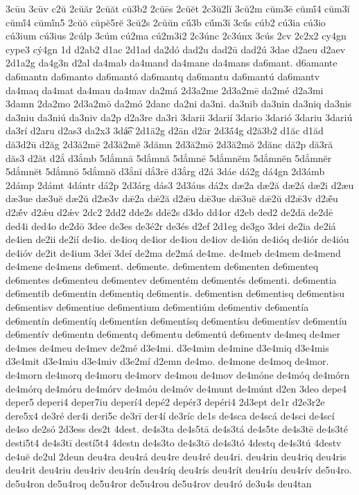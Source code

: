 {3cūu
3cūv
c2ŭ
2cŭăr
2cŭăt
cŭ3b2
2cŭēs
2cŭĕt
2c3ŭ2lĭ
3cŭ2m
cŭm3ē
cŭmī́4
cŭm3ĭ
cŭmĭ́4
cŭmĭ́n5
2cŭŏ
cŭpĕ5rĕ
3cŭ2s
2cŭŭn
cŭ́3b
cŭ́m3ĭ
3cŭ́s
cúb2
cú3ia
cú3io
cú3ium
cú3ius
2cúlp
3cúm
cú2ma
cú2m3i2
2c3únc
2c3únx
3cús
2cv
2c2x2
cy4gn
cype3
cý4gn
1d
d2ab2
d1ac
2d1ad
da2dó
dad2u
dad2ū
dad2ú
3dae
d2aeu
d2aev
2d1a2g
da4g3n
d2al
da4mab
da4mand
da4mane
da4mans
da6mant.
d6amante
da6mantn
da6manto
da6mantó
da6mantq
da6mantu
da6mantú
da6mantv
da4maq
da4mat
da4mau
da4mav
da2má
2d3a2me
2d3a2mē
da2mé
d2a3mi
3damn
2da2mo
2d3a2mō
da2mó
2danc
da2ni
da3ni.
da3nib
da3nin
da3niq
da3nis
da3niu
da3niú
da3niv
da2p
d2a3re
da3ri
3darii
3darií
3dario
3darió
3dariu
3dariú
da3rí
d2aru
d2as3
da2x3
3dá͡e
2d1ā2g
d2ān
d2ār
2d3ā́4g
d2ă3b2
d1ăc
d1ăd
dă3d2ū
d2ăg
2d3ă2mē
2d3ă2mĕ
3dămn
2d3ă2mō
2d3ă2mŏ
2dănc
dă2p
dă3ră
dăs3
d2ăt
d2ắ
d3ắmb
5dắmnā
5dắmnă
5dắmnē
5dắmnĕm
5dắmnĕn
5dắmnĕr
5dắmnĕt
5dắmnō
5dắmnŏ
d3ắnĭ
dắ3rē
d3ắrg
d2á
3dáe
dá2g
dá4gn
2d3ámb
2dámp
2dámt
4dántr
dá2p
2d3árg
dás3
2d3áus
dá2x
dæ2a
dæ2ă
dæ2á
dæ2i
d2æu
dæ3ue
dæ3uĕ
dæ2ŭ
d2æ3v
dǣ2a
dǣ2ă
d2ǣu
dǣ3ue
dǣ3uĕ
dǣ2ŭ
d2ǣ3v
d2ǣ́u
d2ǣ́v
d2ǽu
d2ǽv
2dc2
2dd2
dde2s
ddē2s
d3do
dd4or
d2eb
ded2
de2dā
de2dē
ded4i
ded4o
de2dō
3dee
de3es
de3é2r
de3és
d2ef
2d1eg
de3go
3dei
de2ia
de2iá
de4ien
de2ii
de2ií
de4io.
de4ioq
de4ior
de4iou
de4iov
de4ión
de4ióq
de4iór
de4ióu
de4ióv
de2it
de4ium
3deī
3deí
de2ma
de2má
de4me.
de4meb
de4mem
de4mend
de4mene
de4mens
de6ment.
de6mente.
de6mentem
de6menten
de6menteq
de6mentes
de6menteu
de6mentev
de6mentém
de6mentés
de6menti.
de6mentia
de6mentib
de6mentin
de6mentiq
de6mentis.
de6mentisn
de6mentisq
de6mentisu
de6mentisv
de6mentiue
de6mentium
de6mentiúm
de6mentiv
de6mentía
de6mentín
de6mentíq
de6mentísn
de6mentísq
de6mentísu
de6mentísv
de6mentíu
de6mentív
de6mentn
de6mentq
de6mentu
de6mentú
de6mentv
de4meq
de4mer
de4mes
de4meu
de4mev
de2mé
d3e4mi.
d3e4mim
de4mine
d3e4miq
d3e4mis
d3e4mit
d3e4miu
d3e4miv
d3e2mí
d2emn
de4mo.
de4mone
de4moq
de4mor.
de4morn
de4morq
de4moru
de4morv
de4mou
de4mov
de4móne
de4móq
de4mórn
de4mórq
de4móru
de4mórv
de4móu
de4móv
de4munt
de4múnt
d2en
3deo
depe4
deper5
deperi4
deper7iu
deperí4
depé2
depér3
depéri4
2d3ept
de1r
d2e3r2e
dere5x4
de3ré
der4i
deri5c
de3rī
der4í
de3ríc
de1s
de4sca
de4scá
de4sci
de4scí
de4so
de2só
2d3ess
des2t
4dest.
de4s3ta
de4s5tā
de4s3tá
de4s5te
de4s3tē
de4s3té
desti5t4
de4s3tī
destí5t4
4destn
de4s3to
de4s3tō
de4s3tó
4destq
de4s3tú
4destv
de4uĕ
de2ul
2deun
deu4ra
deu4rá
deu4re
deu4ré
deu4ri.
deu4rin
deu4riq
deu4ris
deu4rit
deu4riu
deu4riv
deu4rín
deu4ríq
deu4rís
deu4rít
deu4ríu
deu4rív
de5u4ro.
de5u4ron
de5u4roq
de5u4ror
de5u4rou
de5u4rov
deu4ró
de3u4s
deu4tan
}

